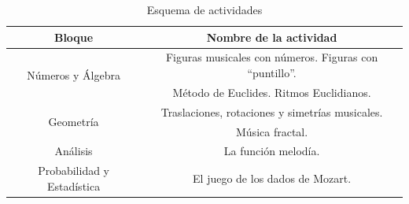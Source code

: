 \documentclass[a4paper, openright, 11pt, titlepage]{report}
\theoremstyle{definition}\newtheorem{defin}[propo]{Definition}
\theoremstyle{definition}\newtheorem{obser}[propo]{Remark}
\theoremstyle{definition}\newtheorem{ejem}[propo]{Ejemplo}
\theoremstyle{definition}\newtheorem{algoritmo}[propo]{Algoritmo}
\begin{document}
\begin{table}[H]
    \centering
    \begin{tabular}{|c|c|}
    \hline
      Bloque & Nombre de la actividad \\
      \hline \hline
      \multirow{2}{*}{Números y Álgebra} & Figuras musicales con números. Figuras con ``puntillo''. \\ 
      \cline{2-2}
      & Método de Euclides. Ritmos Euclidianos. \\
      \hline
      \multirow{2}{*}{Geometría} & Traslaciones, rotaciones y simetrías musicales. \\
      \cline{2-2}
      & Música fractal. \\
      \hline
      Análisis & La función melodía.\\
      \hline
      Probabilidad y Estadística & El juego de los dados de Mozart.\\
      \hline
    \end{tabular}
    \caption{Esquema de actividades}
\end{table}
\end{document}
